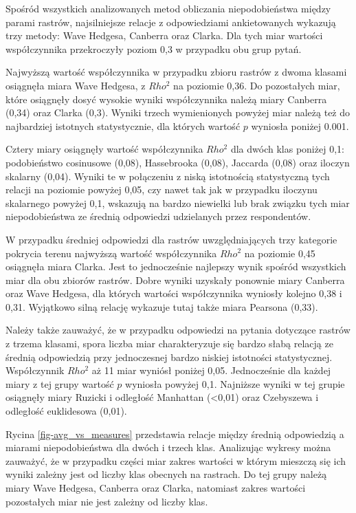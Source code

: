 \documentclass{amuthesis}
\begin{document}
Spośród wszystkich analizowanych metod obliczania niepodobieństwa między
parami rastrów, najsilniejsze relacje z odpowiedziami ankietowanych
wykazują trzy metody: Wave Hedgesa, Canberra oraz Clarka. Dla tych miar
wartości współczynnika przekroczyły poziom 0,3 w przypadku obu grup
pytań.

Najwyższą wartość współczynnika w przypadku zbioru rastrów z dwoma
klasami osiągnęła miara Wave Hedgesa, z \(Rho^2\) na poziomie 0,36. Do
pozostałych miar, które osiągnęły dosyć wysokie wyniki współczynnika
należą miary Canberra (0,34) oraz Clarka (0,3). Wyniki trzech
wymienionych powyżej miar należą też do najbardziej istotnych
statystycznie, dla których wartość \(p\) wyniosła poniżej 0.001.

Cztery miary osiągnęły wartość współczynnika \(Rho^2\) dla dwóch klas
poniżej 0,1: podobieństwo cosinusowe (0,08), Hassebrooka (0,08),
Jaccarda (0,08) oraz iloczyn skalarny (0,04). Wyniki te w połączeniu z
niską istotnością statystyczną tych relacji na poziomie powyżej 0,05,
czy nawet tak jak w przypadku iloczynu skalarnego powyżej 0,1, wskazują
na bardzo niewielki lub brak związku tych miar niepodobieństwa ze
średnią odpowiedzi udzielanych przez respondentów.

W przypadku średniej odpowiedzi dla rastrów uwzględniających trzy
kategorie pokrycia terenu najwyższą wartość współczynnika \(Rho^2\) na
poziomie 0,45 osiągnęła miara Clarka. Jest to jednocześnie najlepszy
wynik spośród wszystkich miar dla obu zbiorów rastrów. Dobre wyniki
uzyskały ponownie miary Canberra oraz Wave Hedgesa, dla których wartości
współczynnika wyniosły kolejno 0,38 i 0,31. Wyjątkowo silną relację
wykazuje tutaj także miara Pearsona (0,33).

Należy także zauważyć, że w przypadku odpowiedzi na pytania dotyczące
rastrów z trzema klasami, spora liczba miar charakteryzuje się bardzo
słabą relacją ze średnią odpowiedzią przy jednoczesnej bardzo niskiej
istotności statystycznej. Współczynnik \(Rho^2\) aż 11 miar wyniósł
poniżej 0,05. Jednocześnie dla każdej miary z tej grupy wartość \(p\)
wyniosła powyżej 0,1. Najniższe wyniki w tej grupie osiągnęły miary
Ruzicki i odległość Manhattan (\textless0,01) oraz Czebyszewa i
odległość euklidesowa (0,01).

Rycina \ref{fig-avg_vs_measures} przedstawia relacje między średnią
odpowiedzią a miarami niepodobieństwa dla dwóch i trzech klas.
Analizując wykresy można zauważyć, że w przypadku części miar zakres
wartości w którym mieszczą się ich wyniki zależny jest od liczby klas
obecnych na rastrach. Do tej grupy należą miary Wave Hedgesa, Canberra
oraz Clarka, natomiast zakres wartości pozostałych miar nie jest zależny
od liczby klas.
\end{document}
